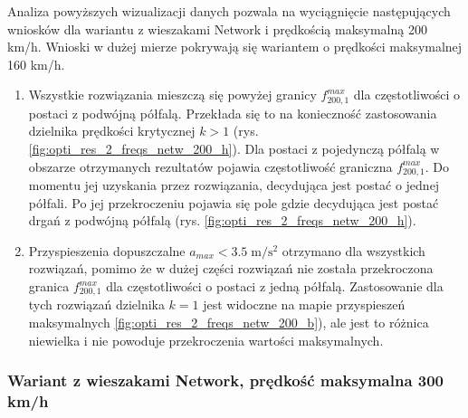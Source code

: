 Analiza powyższych wizualizacji danych pozwala na wyciągnięcie następujących wniosków dla wariantu z wieszakami Network i prędkością maksymalną 200 km/h. Wnioski w dużej mierze pokrywają się wariantem o prędkości maksymalnej 160 km/h.
\begin{enumerate}
	
	\item Wszystkie rozwiązania mieszczą się powyżej granicy $f_{200,1}^{max}$ dla częstotliwości o postaci z podwójną półfalą.  Przekłada się to na konieczność zastosowania dzielnika prędkości krytycznej $k>1$ (rys. \ref{fig:opti_res_2_freqs_netw_200_h}). Dla postaci z pojedynczą półfalą w obszarze otrzymanych rezultatów pojawia częstotliwość graniczna $f_{200,1}^{max}$. Do momentu jej uzyskania przez rozwiązania, decydująca jest postać o jednej półfali. Po jej przekroczeniu pojawia się pole gdzie decydująca jest postać drgań z podwójną półfalą (rys. \ref{fig:opti_res_2_freqs_netw_200_h}).
	\item Przyspieszenia dopuszczalne $a_{max}<3.5\;\mathrm{m/s^2}$ otrzymano dla wszystkich rozwiązań, pomimo że w dużej części rozwiązań nie została przekroczona granica $f_{200,1}^{max}$ dla częstotliwości o postaci z jedną półfalą. Zastosowanie dla tych rozwiązań dzielnika $k=1$ jest widoczne na mapie przyspieszeń maksymalnych \ref{fig:opti_res_2_freqs_netw_200_b}), ale jest to różnica niewielka i nie powoduje przekroczenia wartości maksymalnych.
	
\end{enumerate}
\vfill






\subsubsection{Wariant z wieszakami Network, prędkość maksymalna 300 km/h}

